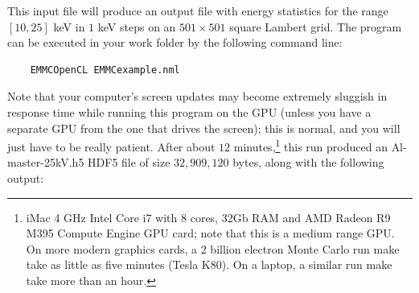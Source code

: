 \documentclass[DIV=calc, paper=letter, fontsize=11pt]{scrartcl}	 %
\begin{document}
This input file will produce an output file with energy statistics for the range $[10,25]$ keV in $1$ keV steps
on an $501\times 501$ square Lambert grid.  The program can be executed in your work folder by the following command line:
\begin{verbatim}
	EMMCOpenCL EMMCexample.nml
\end{verbatim}
Note that your computer's screen updates may become extremely sluggish in response time while running this program on the GPU (unless you have a separate
GPU from the one that drives the screen); this is normal, and you will just have to be really patient.
After about $12$ minutes,\footnote{iMac 4 GHz Intel Core i7 with 8 cores, 32Gb RAM and AMD Radeon R9 M395 Compute Engine GPU card; note that this is a medium 
range GPU. On more modern graphics cards, a 2 billion electron Monte Carlo run make take as little as five minutes (Tesla K80). On a laptop, a similar run
make take more than an hour.} 
this run produced an \textsf{Al-master-25kV.h5} HDF5 file of size $32,909,120$ bytes, along with the following output:
\end{document}
